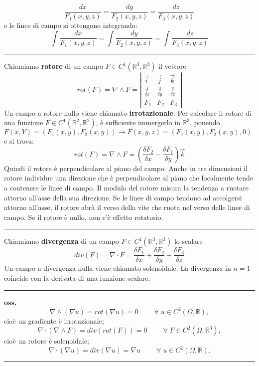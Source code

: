 \[
    \frac{dx}{F_1(x,y,z)} = 
    \frac{dy}{F_2(x,y,z)} = 
    \frac{dz}{F_3(x,y,z)}
\]
e le linee di campo si ottengono integrando:
\[
    \int \frac{dx}{F_1(x,y,z)} = 
    \int \frac{dy}{F_2(x,y,z)} = 
    \int \frac{dz}{F_3(x,y,z)}
\]
\rule{\textwidth}{0,4pt}\newline
Chiamiamo \textbf{rotore} di un campo $F \in C^1(\mathbb{R}^3, \mathbb{R}^3)$ il vettore
\[
    rot(F) = \nabla \land F = \left|\begin{matrix}
        \vec{i} & \vec{j} & \vec{k} \\
        \frac{\delta }{\delta x} & \frac{\delta }{\delta y} & \frac{\delta }{\delta z}\\
        F_1 & F_2 & F_3
    \end{matrix} \right|
\]
Un campo a rotore nullo viene chiamato \textbf{irrotazionale}.\newline
Per calcolare il rotore di una funzione $F \in C^1(\mathbb{R}^2, \mathbb{R}^2)$, è sufficiente immergerlo in $\mathbb{R}^3$, ponendo $F(x,Y) = (F_1(x,y), F_2(x,y)) \rightarrow  F(x,y,z) = (F_1(x,y), F_2(x,y), 0)$ e si trova:
\[
    rot(F) = \nabla\land F = \left(\frac{\delta F_2}{\delta x} - \frac{\delta F_1}{\delta y}\right)\vec{k}
\]
Quindi il rotore è perpendicolare al piano del campo.\newline
Anche in tre dimensioni il rotore individue una direzione che è perpendicolare al piano che localmente tende a contenere le linee di campo.\newline
Il modulo del rotore misura la tendenza a ruotare attorno all'asse della sua direzione. Se le linee di campo tendono ad accolgersi attorno all'asse, il rotore abrà il verso della vite che ruota nel verso delle linee di campo. Se il rotore è nullo, non c'è effetto rotatorio.\newline
\rule{\textwidth}{0,4pt}\newline
Chiamiamo \textbf{divergenza} di un campo $F \in C^1(\mathbb{R}^3, \mathbb{R}^3)$ lo scalare
\[
    div(F) = \nabla \cdot F = \frac{\delta F_1}{\delta x} +\frac{\delta F_2}{\delta y} +\frac{\delta F_3}{\delta z}
\]
Un campo a divergenza nulla viene chiamato solenoidale.\newline
La divergenza in $n=1$ coincide con la derivata di una funzione scalare.\newline
\rule{\textwidth}{0,4pt}
\newline
\newline
\textbf{oss.} 
\[
    \nabla \land (\nabla u) = rot(\nabla u) = 0 \quad \quad \;\forall\;u \in C^2(\Omega, \mathbb{R}),
\]
cioè un gradiente è irrotazionale;
\[
    \nabla \cdot  (\nabla \land F) = div(rot(F)) = 0 \quad \quad \;\forall\; F \in C^2(\Omega, \mathbb{R}^3),
\]
cioè un rotore è solenoidale;
\[
    \nabla \cdot (\nabla u) = div(\nabla u) = \nabla u \quad \quad \;\forall\;u \in C^2(\Omega, \mathbb{R}).
\]
\rule{\textwidth}{2pt}
